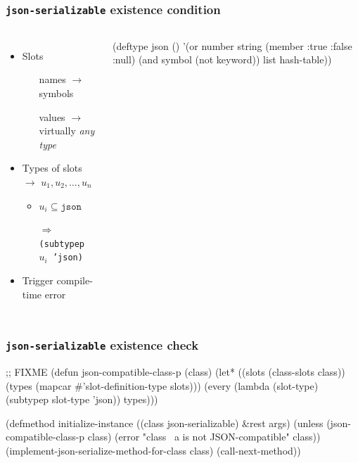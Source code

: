 \documentclass[aspectratio=169]{beamer}
\renewcommand\code[1]{\texttt{#1}}
\newcommand\rarr{\ensuremath{\rightarrow}}
\newcommand\Rarr{\ensuremath{\Rightarrow}}
\newcommand\tgood{{\color{watchOS-purple}\faThumbsOUp}}
\newcommand\tbad{{\color{watchOS-red}\faThumbsODown}}
\begin{document}
\begin{frame}[fragile]
  \frametitle{\code{json-serializable} existence condition}
  \begin{columns}
    \begin{itemize}
    \item Slots
      \begin{itemize}
      \item[\tgood] names \rarr{} symbols
      \item[\tbad] values \rarr{} virtually \emph{any type}
      \end{itemize}
    \item<3-> Types of slots \rarr{} $u_1, u_2, \dots, u_n$
      \begin{itemize}
      \item $u_i \subseteq \code{json}$
      \item[\Rarr{}] \code{(subtypep $u_i$ 'json)}
      \end{itemize}
    \item<3-> Trigger compile-time error
  \end{itemize}

\begin{clcode}
(deftype json ()
  '(or number
       string
       (member :true
               :false
               :null)
       (and symbol
            (not keyword))
       list
       hash-table))
\end{clcode}
  \end{columns}
\end{frame}

\begin{frame}[fragile]
  \frametitle{\code{json-serializable} existence check}
\begin{clcode}
;; FIXME
(defun json-compatible-class-p (class)
  (let* ((slots (class-slots class))
         (types (mapcar #'slot-definition-type slots)))
    (every (lambda (slot-type)
             (subtypep slot-type 'json))
           types)))

(defmethod initialize-instance ((class json-serializable)
                                &rest args)
  (unless (json-compatible-class-p class)
    (error "class ~a is not JSON-compatible" class))
  (implement-json-serialize-method-for-class class)
  (call-next-method))
\end{clcode}
\end{frame}
\end{document}
